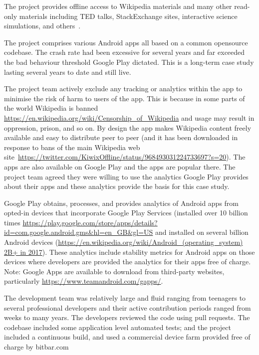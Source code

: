 The project provides offline access to Wikipedia materials and many other read-only materials including TED talks, StackExchange sites, interactive science simulations, and others~\citep{kiwix_about_the_project, gomez2017_wikimedia_kiwix_article}. 

The project comprises various Android apps all based on a common opensource codebase. The crash rate had been excessive for several years and far exceeded the bad behaviour threshold Google Play dictated. This is a long-term case study lasting several years to date and still live.


The project team actively exclude any tracking or analytics within the app to minimise the risk of harm to users of the app. This is because in some parts of the world Wikipedia is banned \url{https://en.wikipedia.org/wiki/Censorship\_of\_Wikipedia} and usage may result in oppression, prison, and so on. By design the app makes Wikipedia content freely available and easy to distribute peer to peer (and it has been downloaded in response to bans of the main Wikipedia web site~\url{https://twitter.com/KiwixOffline/status/968493031224733697?s=20}). The apps are also available on Google Play and the apps are popular there. The project team agreed they were willing to use the analytics Google Play provides about their apps and these analytics provide the basis for this case study.

Google Play obtains, processes, and provides analytics of Android apps from opted-in devices that incorporate Google Play Services (installed over 10 billion times \url{https://play.google.com/store/apps/details?id=com.google.android.gms&hl=en\_GB&gl=US} and installed on several billion Android devices (\url{https://en.wikipedia.org/wiki/Android_(operating_system) 2B+ in 2017}). These analytics include stability metrics for Android apps on those devices where developers are provided the analytics for their apps free of charge.
Note: Google Apps are available to download from third-party websites, particularly \url{https://www.teamandroid.com/gapps/}. 


The development team was relatively large and fluid ranging from teenagers to several professional developers and their active contribution periods ranged from weeks to many years. The developers reviewed the code using pull requests.  The codebase included some application level automated tests; and the project included a continuous build, and used a commercial device farm provided free of charge by bitbar.com 

